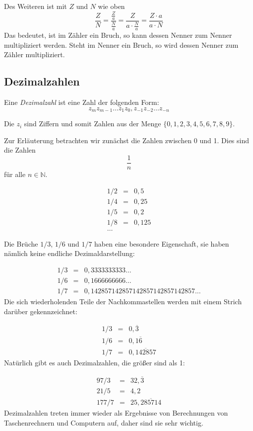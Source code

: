 Des Weiteren ist mit $Z$ und $N$ wie oben
\[
\frac{Z}{N} = \frac{\frac{Z}{a}}{\frac{N}{a}} = \frac{Z}{a\cdot \frac{N}{a}} = \frac{Z \cdot a}{a\cdot N}
\]
Das bedeutet, ist im Zähler ein Bruch, so kann dessen Nenner zum Nenner multipliziert werden. Steht im Nenner ein Bruch, so wird dessen Nenner zum Zähler multipliziert. 

\subsection{Dezimalzahlen}

\begin{definition}
Eine \emph{Dezimalzahl} ist eine Zahl der folgenden Form:
\[ z_m z_{m-1} \dots z_1 z_0, z_{-1} z_{-2} \dots z_{-n} \]
\end{definition}
Die $z_i$ sind Ziffern und somit Zahlen aus der Menge $\{0,1,2,3,4,5,6,7,8,9\}$.

Zur Erläuterung betrachten wir zunächst die Zahlen zwischen 0 und 1. Dies sind die Zahlen 
\[ \frac{1}{n}\] für alle $n\in \mathbb{N}$. 

\begin{eqnarray*}
1/2 &=& 0,5 \\
1/4 &=& 0,25 \\
1/5 &=& 0,2 \\
1/8 &=& 0,125 \\
\dots
\end{eqnarray*}

Die Brüche $1/3$, $1/6$ und $1/7$ haben eine besondere Eigenschaft, sie haben nämlich keine endliche Dezimaldarstellung:

\begin{eqnarray*}
1/3 &=& 0,3333333333\dots \\
1/6 &=& 0,1666666666\dots \\
1/7 &=& 0,142857142857142857142857142857\dots
\end{eqnarray*}
Die sich wiederholenden Teile der Nachkommastellen werden mit einem Strich darüber gekennzeichnet:

\begin{eqnarray*}
1/3 &=& 0,\overline{3} \\
1/6 &=& 0,1\overline{6} \\
1/7 &=& 0,\overline{142857}
\end{eqnarray*}
Natürlich gibt es auch Dezimalzahlen, die größer sind als 1:

\begin{eqnarray*}
97/3 &=& 32,\overline{3} \\
21/5 &=& 4,2 \\
177/7 &=& 25,\overline{285714}
\end{eqnarray*}
Dezimalzahlen treten immer wieder als Ergebnisse von Berechnungen von Taschenrechnern und Computern auf, daher sind sie sehr wichtig. 

